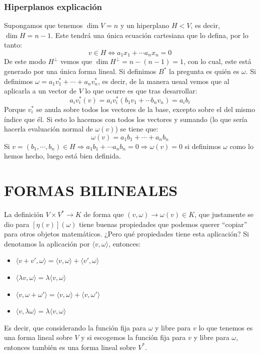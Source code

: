 \documentclass[10pt,a4paper,openright]{book}
\theoremstyle{break}
\begin{document}
\subsubsection{Hiperplanos explicación}
Supongamos que tenemos $\dim V=n$ y un hiperplano $H<V$, es decir, $\dim H=n-1$. Este tendrá una única ecuación cartesiana que lo defina, por lo tanto:
$$v\in H\Leftrightarrow a_1x_1+\cdots a_nx_n=0$$
De este modo $H^\perp$ vemos que $\dim H^\perp = n-(n-1)=1$, con lo cual, este está generado por una única forma lineal. Si definimos $B^*$ la pregunta es quién es $\omega$. Si definimos $\omega=a_1v_1^*+\cdots + a_nv_n^*$, es decir, de la manera usual vemos que al aplicarla a un vector de $V$ lo que ocurre es que tras desarrollar:
$$a_iv_i^*(v) = a_iv_i^*(b_1v_1+\cdots b_nv_n)=a_ib_i$$
Porque $v_i^*$ se anula sobre todos los vectores de la base, excepto sobre el del mismo índice que él. Si esto lo hacemos con todos los vectores y sumando (lo que sería hacerla evaluación normal de $\omega(v)$) se tiene que:
$$\omega(v)=a_1b_1+\cdots +a_nb_n$$
Si $v=(b_1, \cdots, b_n)\in H\Rightarrow a_1b_1+\cdots a_nb_n=0\Rightarrow \omega(v)=0$ si definimos $\omega$ como lo hemos hecho, luego está bien definida.

\section{FORMAS BILINEALES}
\label{Formas bilineales}
La definición $V\times V^* \rightarrow K$ de forma que $(v,\omega)\rightarrow \omega(v)\in K$, que justamente se dio para $\left[\eta(v)\right](\omega)$ tiene buenas propiedades que podemos querer ``copiar'' para otros objetos matemáticos. ¿Pero qué propiedades tiene esta aplicación? Si denotamos la aplicación por $\langle v,\omega\rangle$, entonces:
\begin{itemize}
\item $\langle v+v',\omega\rangle=\langle v,\omega\rangle+\langle v',\omega\rangle$
\item $\langle\lambda v,\omega\rangle = \lambda \langle v,\omega\rangle$
\item $\langle v,\omega+\omega'\rangle =\langle v,\omega\rangle+\langle v,\omega'\rangle$
\item $\langle v,\lambda\omega\rangle = \lambda \langle v,\omega\rangle$
\end{itemize}
Es decir, que considerando la función fija para $\omega$ y libre para $v$ lo que tenemos es una forma lineal sobre $V$ y si escogemos la función fija para $v$ y libre para $\omega$, entonces también es una forma lineal sobre $V^*$.
\end{document}
